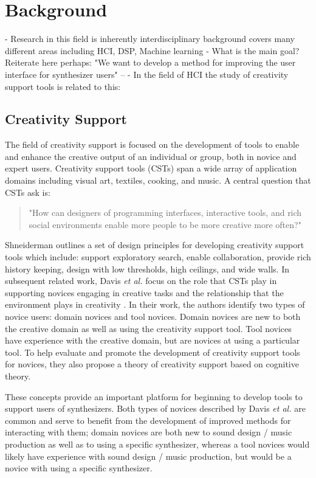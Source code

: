 \chapter{Background}
\label{chapter:background}
- Research in this field is inherently interdisciplinary background covers many different areas including HCI, DSP, Machine learning
- What is the main goal? Reiterate here perhaps: "We want to develop a method for improving the user interface for synthesizer users" -- 
- In the field of HCI the study of creativity support tools is related to this:

\section{Creativity Support}
The field of creativity support is focused on the development of tools to enable and enhance the creative output of an individual or group, both in novice and expert users. Creativity support tools (CSTs) \cite{shneiderman2007creativity} span a wide array of application domains including visual art, textiles, cooking, and music. A central question that CSTs ask is: 
\begin{quote}
    "How can designers of programming interfaces, interactive tools, and rich social environments enable more people to be more creative more often?"
\end{quote}
 Shneiderman \cite{shneiderman2007creativity} outlines a set of design principles for developing creativity support tools which include: support exploratory search, enable collaboration, provide rich history keeping, design with low thresholds, high ceilings, and wide walls. In subsequent related work, Davis \textit{et al.} focus on the role that CSTs play in supporting novices engaging in creative tasks and the relationship that the environment plays in creativity \cite{davis2013toward}. In their work, the authors identify two types of novice users: domain novices and tool novices. Domain novices are new to both the creative domain as well as using the creativity support tool. Tool novices have experience with the creative domain, but are novices at using a particular tool. To help evaluate and promote the development of creativity support tools for novices, they also propose a theory of creativity support based on cognitive theory.

These concepts provide an important platform for beginning to develop tools to support users of synthesizers. Both types of novices described by Davis \textit{et al.} are common and serve to benefit from the development of improved methods for interacting with them; domain novices are both new to sound design / music production as well as to using a specific synthesizer, whereas a tool novices would likely have experience with sound design / music production, but would be a novice with using a specific synthesizer. 

